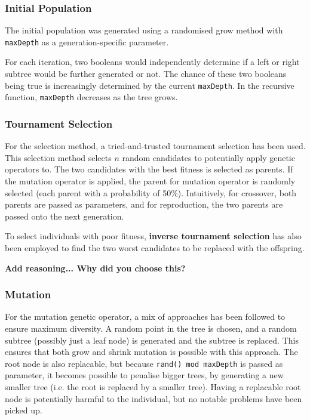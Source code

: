 \documentclass{article}
\begin{document}
\subsubsection{Initial Population}
The initial population was generated using a randomised grow method with \texttt{maxDepth} as a generation-specific parameter.

For each iteration, two booleans would independently determine if a left or right subtree would be further generated or not. The chance of these two booleans being true is increasingly determined by the current \texttt{maxDepth}. In the recursive function, \texttt{maxDepth} decreases as the tree grows.

\subsubsection{Tournament Selection}
\label{selection}
For the selection method, a tried-and-trusted tournament selection has been used. This selection method selects \(n\) random candidates to potentially apply genetic operators to. The two candidates with the best fitness is selected as parents. If the mutation operator is applied, the parent for mutation operator is randomly selected (each parent with a probability of 50\%). Intuitively, for crossover, both parents are passed as parameters, and for reproduction, the two parents are passed onto the next generation.

To select individuals with poor fitness, \textbf{inverse tournament selection} has also been employed to find the two worst candidates to be replaced with the offspring.

\textbf{Add reasoning... Why did you choose this?}

\subsubsection{Mutation}
For the mutation genetic operator, a mix of approaches has been followed to ensure maximum diversity. A random point in the tree is chosen, and a random subtree (possibly just a leaf node) is generated and the subtree is replaced. This ensures that both grow and shrink mutation is possible with this approach. The root node is also replacable, but because \texttt{rand() mod maxDepth} is passed as parameter, it becomes possible to penalise bigger trees, by generating a new smaller tree (i.e. the root is replaced by a smaller tree). Having a replacable root node is potentially harmful to the individual, but no notable problems have been picked up.
\end{document}
